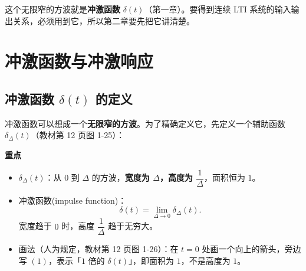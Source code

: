 \documentclass[UTF8,a4paper,11pt]{ctexart}
\newenvironment{remember}{\begin{rememberbox}\textbf{重点}\par\smallskip}{\end{rememberbox}}
\newcounter{ex}[section]
\begin{document}
这个无限窄的方波就是\textbf{冲激函数} $\delta(t)$（第一章）。要得到连续 LTI 系统的输入输出关系，必须用到它，所以第二章要先把它讲清楚。

\section{冲激函数与冲激响应}\label{sec:delta}
\subsection{\texorpdfstring{冲激函数 $\delta(t)$ 的定义}{冲激函数 δ(t) 的定义}}
冲激函数可以想成一个\textbf{无限窄的方波}。为了精确定义它，先定义一个辅助函数 $\delta_\Delta(t)$（教材第 12 页图 1-25）：

\begin{remember}
\begin{itemize}[nosep]
\item $\delta_\Delta(t)$：从 $0$ 到 $\Delta$ 的方波，\textbf{宽度为 $\Delta$，高度为 $\dfrac1\Delta$}，面积恒为 $1$。
\item 冲激函数(impulse function)：
\[
\delta(t)=\lim_{\Delta\to0}\delta_\Delta(t).
\]
宽度趋于 $0$ 时，高度 $\dfrac1\Delta$ 趋于无穷大。
\item 画法（人为规定，教材第 12 页图 1-26）：在 $t=0$ 处画一个向上的箭头，旁边写 $(1)$，表示「$1$ 倍的 $\delta(t)$」，即面积为 $1$，不是高度为 $1$。
\end{itemize}
\end{remember}
\end{document}
